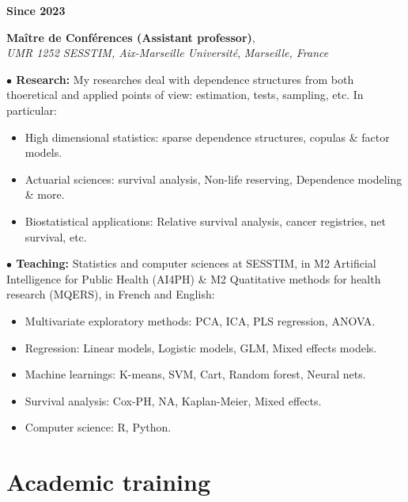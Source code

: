 \documentclass[a4paper,11pt]{article}
\newcommand{\tabcv}[2]{
\begin{minipage}[t]{0.12\linewidth}
\textbf{\footnotesize #1}
\end{minipage}\hfill
\begin{minipage}[t]{0.85\linewidth}
#2
\end{minipage}
\vspace{1em}
}
\begin{document}
\begin{flushleft}
\tabcv{Since 2023}{
\textbf{Maître de Conférences (Assistant professor)},\\ \textit{UMR 1252 SESSTIM, Aix-Marseille Université}, \textit{Marseille, France}\\[0.5em]
{\footnotesize
\textbf{$\bullet$ Research:} My researches deal with dependence structures from both thoeretical and applied points of view: estimation, tests, sampling, etc. In particular: 
\begin{itemize}
  \item High dimensional statistics: sparse dependence structures, copulas \& factor models.
  \item Actuarial sciences: survival analysis, Non-life reserving, Dependence modeling \& more.
  \item Biostatistical applications: Relative survival analysis, cancer registries, net survival, etc.
\end{itemize}
\textbf{$\bullet$ Teaching:} Statistics and computer sciences at SESSTIM, in M2 Artificial Intelligence for Public Health (AI4PH)  \& M2 Quatitative methods for health research (MQERS), in French and English:
\begin{itemize}
  \item Multivariate exploratory methods: PCA, ICA, PLS regression, ANOVA.
  \item Regression: Linear models, Logistic models, GLM, Mixed effects models.
  \item Machine learnings: K-means, SVM, Cart, Random forest, Neural nets. 
  \item Survival analysis: Cox-PH, NA, Kaplan-Meier, Mixed effects.
  \item Computer science: R, Python.
\end{itemize}
}
}

\section{Academic training}\label{subsec:formation_academique}


\end{flushleft}
\end{document}

